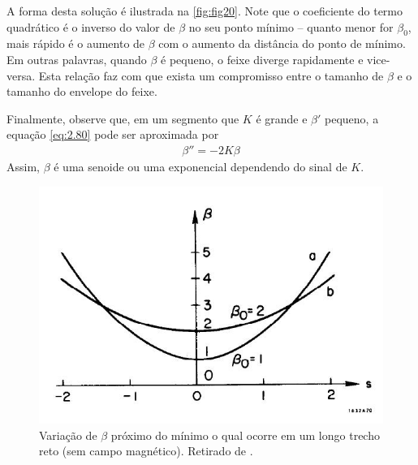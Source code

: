 A forma desta solução é ilustrada na \autoref{fig:fig20}. Note que o coeficiente do termo quadrático é o inverso do valor de $\beta$ no seu ponto mínimo -- quanto menor for $\beta_0$, mais rápido é o aumento de $\beta$ com o aumento da distância do ponto de mínimo. Em outras palavras, quando $\beta$ é pequeno, o feixe diverge rapidamente e vice-versa. Esta relação faz com que exista um compromisso entre o tamanho de $\beta$ e o tamanho do envelope do feixe.

Finalmente, observe que, em um segmento que $K$ é grande e $\beta'$ pequeno, a equação \eqref{eq:2.80} pode ser aproximada por
\begin{align}
	\beta'' = -2K\beta
\end{align}
Assim, $\beta$ é uma senoide ou uma exponencial dependendo do sinal de $K$.

\begin{figure}[!htb]
	\centering
	\includegraphics[width=0.7\linewidth]{./Figuras/fig20.jpeg}
	\caption{Variação de $\beta$ próximo do mínimo o qual ocorre em um longo trecho reto (sem campo magnético). Retirado de \cite{sands1970physics}.}
	\label{fig:fig20}
\end{figure}